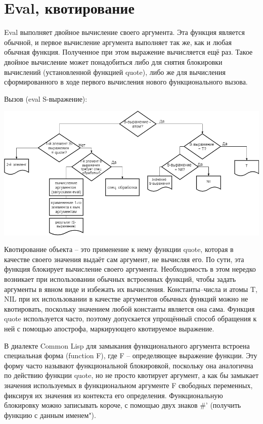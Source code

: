 \documentclass[12pt]{report}
\begin{document}
\section*{Eval, квотирование}

Eval выполняет двойное  вычисление своего аргумента. Эта функция является обычной, и первое  вычисление аргумента выполняет так же, как и любая обычная функция.  Полученное при этом выражение вычисляется ещё раз. Такое двойное  вычисление может понадобиться либо для снятия блокировки вычислений (установленной функцией quote), либо же для вычисления сформированного в ходе первого вычисления нового функционального вызова.

Вызов (eval S-выражение):

\includegraphics[scale=0.5]{img/eval}



Квотирование объекта -- это применение к нему функции quote, которая в качестве своего значения выдаёт сам аргумент, не вычисляя его. По сути, эта функция блокирует вычисление своего аргумента. Необходимость в этом нередко возникает при использовании обычных встроенных функций, чтобы задать аргументы в явном виде и избежать их вычисления. Константы–числа и атомы T, NIL при их  использовании в качестве аргументов обычных функций можно не  квотировать, поскольку значением любой константы является она сама. Функция quote используется часто, поэтому допускается упрощённый способ обращения к ней с помощью апострофа, маркирующего квотируемое выражение.


В диалекте Common Lisp для замыкания функционального аргумента встроена специальная форма (function F), где F – определяющее  выражение функции. Эту форму часто называют функциональной  блокировкой, поскольку она аналогична по действию функции quote, но  не просто квотирует аргумент, а как бы замыкает значения используемых  в функциональном аргументе F свободных переменных, фиксируя их значения из контекста его определения. Функциональную блокировку  можно записывать короче, с помощью двух знаков \#' (получить функцию с данным именем").
\end{document}
